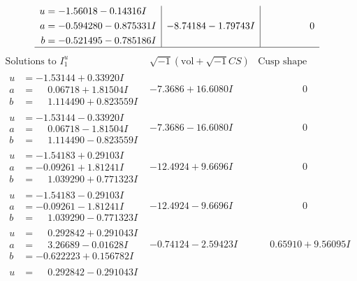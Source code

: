 \documentclass[1p]{elsarticle_modified}
\theoremstyle{definition}
\newcommand{\I}{\sqrt{-1}}
\begin{document}
$$\begin{array}{c|c|c}
\begin{aligned}
u &= -1.56018 - 0.14316 I \\
a &= -0.594280 - 0.875331 I \\
b &= -0.521495 - 0.785186 I\end{aligned}
 & -8.74184 - 1.79743 I & \phantom{-0.000000 } 0\\
 \hline 
 \end{array}$$\newpage$$\begin{array}{c|c|c}  
\text{Solutions to }I^u_{1}& \I (\text{vol} + \sqrt{-1}CS) & \text{Cusp shape}\\
 \hline 
\begin{aligned}
u &= -1.53144 + 0.33920 I \\
a &= \phantom{-}0.06718 + 1.81504 I \\
b &= \phantom{-}1.114490 + 0.823559 I\end{aligned}
 & -7.3686 + 16.6080 I & \phantom{-0.000000 } 0 \\ \hline\begin{aligned}
u &= -1.53144 - 0.33920 I \\
a &= \phantom{-}0.06718 - 1.81504 I \\
b &= \phantom{-}1.114490 - 0.823559 I\end{aligned}
 & -7.3686 - 16.6080 I & \phantom{-0.000000 } 0 \\ \hline\begin{aligned}
u &= -1.54183 + 0.29103 I \\
a &= -0.09261 + 1.81241 I \\
b &= \phantom{-}1.039290 + 0.771323 I\end{aligned}
 & -12.4924 + 9.6696 I & \phantom{-0.000000 } 0 \\ \hline\begin{aligned}
u &= -1.54183 - 0.29103 I \\
a &= -0.09261 - 1.81241 I \\
b &= \phantom{-}1.039290 - 0.771323 I\end{aligned}
 & -12.4924 - 9.6696 I & \phantom{-0.000000 } 0 \\ \hline\begin{aligned}
u &= \phantom{-}0.292842 + 0.291043 I \\
a &= \phantom{-}3.26689 - 0.01628 I \\
b &= -0.622223 + 0.156782 I\end{aligned}
 & -0.74124 - 2.59423 I & \phantom{-}0.65910 + 9.56095 I \\ \hline\begin{aligned}
u &= \phantom{-}0.292842 - 0.291043 I \\

\end{aligned}
\end{array}$$
\end{document}
